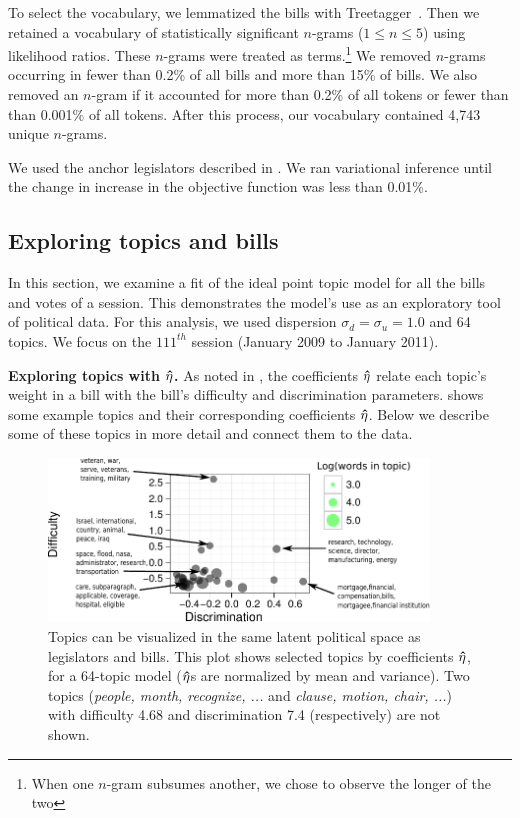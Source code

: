 To select the vocabulary, we lemmatized the bills with
Treetagger~\cite{treetagger}.  Then we retained a vocabulary of
statistically significant $n$-grams ($1 \le n \le 5$) using likelihood
ratios.  These $n$-grams were treated as terms.\footnote{When one
  $n$-gram subsumes another, we chose to observe the longer of the
  two}  We removed $n$-grams occurring in fewer than 0.2\% of all
bills and more than 15\% of bills.  We also removed an
$n$-gram if it accounted for more than 0.2\% of all tokens or fewer
than than 0.001\% of all tokens.  After this process, our vocabulary
contained 4,743 unique $n$-grams.

We used the anchor legislators described in .  We ran
variational inference until the change in increase in the objective
function was less than 0.01\%.

\subsection{Exploring topics and bills}

In this section, we examine a fit of the ideal point topic model for
all the bills and votes of a session.  This demonstrates the model's
use as an exploratory tool of political data.  For this analysis, we
used dispersion $\sigma_d = \sigma_u = 1.0$ and 64 topics.  We focus
on the $111^{th}$ session (January 2009 to January 2011).

\textbf{Exploring topics with $\bm \hat \eta$.} As noted in , the
coefficients $\bm \hat \eta$ relate each topic's weight in a bill with the
bill's difficulty and discrimination parameters.  shows
some example topics and their corresponding coefficients $\bm \hat \eta$.  Below
we describe some of these topics in more detail and connect them to
the data.

\begin{figure}
  \center
  \includegraphics[width=0.9\textwidth]{chapter_spatial_voting_with_text/figures/134_64_topic_plot.pdf}
  \caption{Topics can be visualized in the same latent political space
    as legislators and bills.  This plot shows selected topics by
    coefficients $\bm \hat \eta$, for a 64-topic model ($\bm \hat \eta$s are normalized by
    mean and variance).  Two topics (\emph{people, month, recognize, ...}
    and \emph{clause, motion, chair, ...}) with difficulty 4.68 and
    discrimination 7.4 (respectively) are not shown.}
  \label{fig:topics}
\end{figure}

